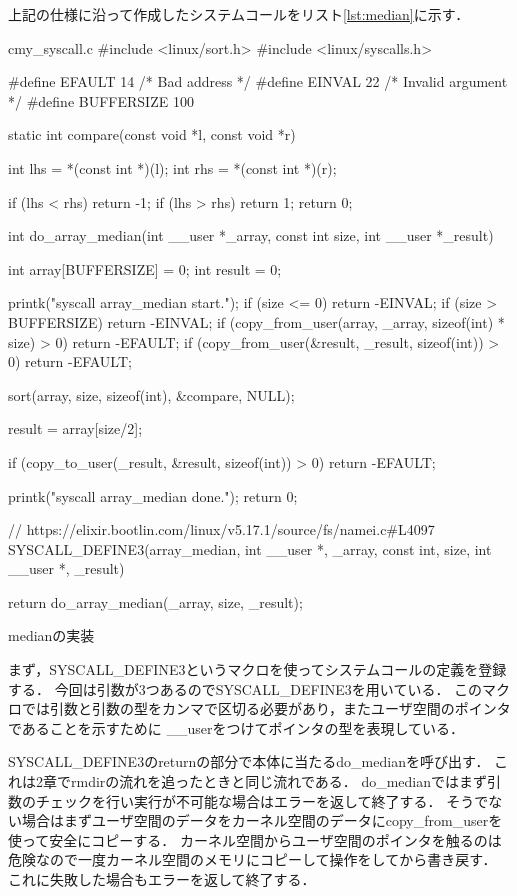 上記の仕様に沿って作成したシステムコールをリスト\ref{lst:median}に示す．
\begin{longlisting}
\begin{myminted}{c}{my\_syscall.c}
#include <linux/sort.h>
#include <linux/syscalls.h>

#define	EFAULT 14	/* Bad address */
#define	EINVAL 22	/* Invalid argument */
#define BUFFERSIZE 100

static int compare(const void *l, const void *r) {
    int lhs = *(const int *)(l);
    int rhs = *(const int *)(r);

    if (lhs < rhs) return -1;
    if (lhs > rhs) return 1;
    return 0;
}

int do_array_median(int __user *_array, const int size, int __user *_result) {
    int array[BUFFERSIZE] = {0};
    int result = 0;

    printk("syscall array_median start.");
    if (size <= 0) return -EINVAL;
    if (size > BUFFERSIZE) return -EINVAL;
    if (copy_from_user(array, _array, sizeof(int) * size) > 0) return -EFAULT;
    if (copy_from_user(&result, _result, sizeof(int)) > 0) return -EFAULT;

    sort(array, size, sizeof(int), &compare, NULL);

    result = array[size/2];

    if (copy_to_user(_result, &result, sizeof(int)) > 0) return -EFAULT;
    
    printk("syscall array_median done.");
    return 0;
}

// https://elixir.bootlin.com/linux/v5.17.1/source/fs/namei.c#L4097
SYSCALL_DEFINE3(array_median,
        int __user *, _array,
        const int, size,
        int __user *, _result) {

    return do_array_median(_array, size, _result);
}
\end{myminted}
\caption{medianの実装}
\label{lst:median}
\end{longlisting}

まず，SYSCALL\_DEFINE3というマクロを使ってシステムコールの定義を登録する．
今回は引数が3つあるのでSYSCALL\_DEFINE3を用いている．
このマクロでは引数と引数の型をカンマで区切る必要があり，またユーザ空間のポインタであることを示すために
\_\_userをつけてポインタの型を表現している．

SYSCALL\_DEFINE3のreturnの部分で本体に当たるdo\_medianを呼び出す．
これは2章でrmdirの流れを追ったときと同じ流れである．
do\_medianではまず引数のチェックを行い実行が不可能な場合はエラーを返して終了する．
そうでない場合はまずユーザ空間のデータをカーネル空間のデータにcopy\_from\_userを使って安全にコピーする．
カーネル空間からユーザ空間のポインタを触るのは危険なので一度カーネル空間のメモリにコピーして操作をしてから書き戻す．
これに失敗した場合もエラーを返して終了する．

